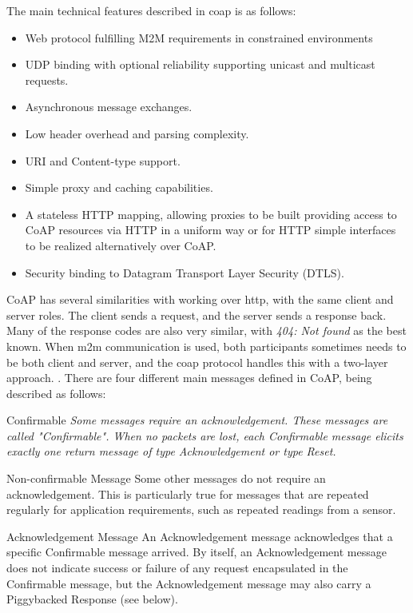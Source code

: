 The main technical features described in \gls{coap} is as follows: 

\begin{itemize}
	\item Web protocol fulfilling M2M requirements in constrained
      environments
	\item UDP binding with optional reliability supporting unicast
      and multicast requests.
	\item Asynchronous message exchanges.
	\item Low header overhead and parsing complexity.
	\item URI and Content-type support.
	\item Simple proxy and caching capabilities.
	\item A stateless HTTP mapping, allowing proxies to be built providing
      access to CoAP resources via HTTP in a uniform way or for HTTP
      simple interfaces to be realized alternatively over CoAP.
	\item Security binding to Datagram Transport Layer Security (DTLS).	
\end{itemize}


CoAP has several similarities with working over \gls{http}, with the same client and server roles. The client sends a request, and the server sends a response back. Many of the response codes are also very similar, with \textit{404: Not found} as the best known. When \gls{m2m} communication is used, both participants sometimes needs to be both client and server, and the \gls {coap} protocol handles this with a two-layer approach. . There are four different main messages defined in CoAP, being described as follows: 

   Confirmable
	  \textit{Some messages require an acknowledgement.  These messages are
      called "Confirmable".  When no packets are lost, each Confirmable
      message elicits exactly one return message of type Acknowledgement
      or type Reset.}

   Non-confirmable Message
      Some other messages do not require an acknowledgement.  This is
      particularly true for messages that are repeated regularly for
      application requirements, such as repeated readings from a sensor.

   Acknowledgement Message
      An Acknowledgement message acknowledges that a specific
      Confirmable message arrived.  By itself, an Acknowledgement
      message does not indicate success or failure of any request
      encapsulated in the Confirmable message, but the Acknowledgement
      message may also carry a Piggybacked Response (see below).
      
